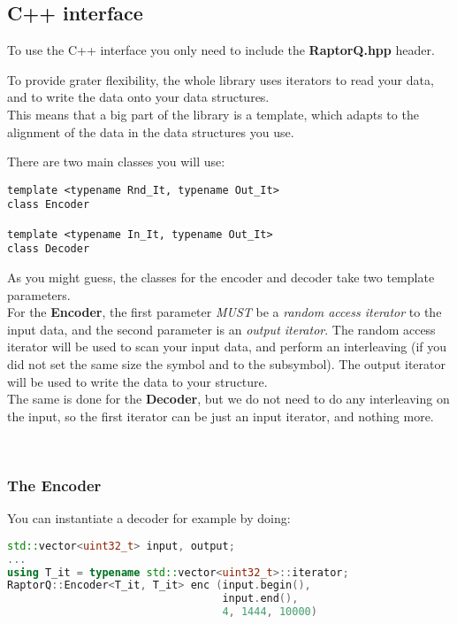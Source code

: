 \documentclass[11pt,a4paper]{refart}
\begin{document}
\subsection{C++ interface}
To use the C++ interface you only need to include the \textbf{RaptorQ.hpp} header.

To provide grater flexibility, the whole library uses iterators to read your data, and to write the data onto your data structures.\\
This means that a big part of the library is a template, which adapts to the alignment of the data in the data structures you use.

There are two main classes you will use:
\begin{verbatim}
template <typename Rnd_It, typename Out_It>
class Encoder

template <typename In_It, typename Out_It>
class Decoder
\end{verbatim}

As you might guess, the classes for the encoder and decoder take two template parameters.\\
For the \textbf{Encoder}, the first parameter \textit{MUST} be a \textit{random access iterator} to the input data, and the second parameter is an
\textit{output iterator}. The random access iterator will be used to scan your input data, and perform an interleaving (if you did not set the same size the
symbol and to the subsymbol). The output iterator will be used to write the data to your structure.\\
The same is done for the \textbf{Decoder}, but we do not need to do any interleaving on the input, so the first iterator can be just an input iterator,
and nothing more.

~\\

\subsubsection{The Encoder}
You can instantiate a decoder for example by doing:

\begin{lstlisting}[language=C++]
std::vector<uint32_t> input, output;
...
using T_it = typename std::vector<uint32_t>::iterator;
RaptorQ::Encoder<T_it, T_it> enc (input.begin(),
                                  input.end(),
                                  4, 1444, 10000)
\end{lstlisting}
\end{document}
